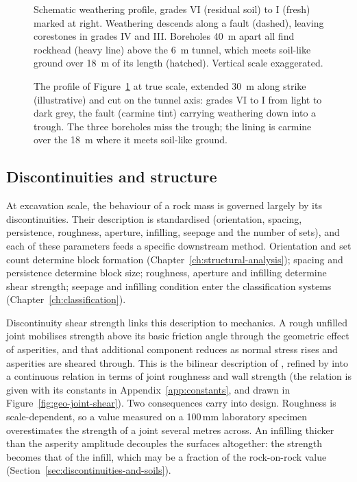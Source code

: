 \begin{figure}[htbp]
\centering
{}
\caption{Schematic weathering profile, grades VI (residual soil) to I (fresh)
marked at right. Weathering descends along a fault (dashed), leaving
corestones in grades IV and III. Boreholes 40~m apart all find rockhead (heavy
line) above the 6~m tunnel, which meets soil-like ground over 18~m of its
length (hatched). Vertical scale exaggerated.}
\label{fig:geo-weathering-profile}
\end{figure}

\begin{figure}[htbp]
\centering
{}
\caption{The profile of Figure~\ref{fig:geo-weathering-profile} at true scale,
extended 30~m along strike (illustrative) and cut on the tunnel axis: grades VI
to I from light to dark grey, the fault (carmine tint) carrying weathering down
into a trough. The three boreholes miss the trough; the lining is carmine
over the 18~m where it meets soil-like ground.}
\label{fig:r3d-weathering-block}
\end{figure}

\subsection{Discontinuities and structure}
\label{sec:discontinuities}

At excavation scale, the behaviour of a rock mass is governed largely by its
discontinuities. Their
description is standardised (orientation, spacing, persistence, roughness,
aperture, infilling, seepage and the number of sets), and each of these
parameters feeds a specific downstream method. Orientation and set count
determine block formation (Chapter~\ref{ch:structural-analysis}); spacing and
persistence determine block size; roughness, aperture and infilling determine
shear strength; seepage and infilling condition enter the classification
systems (Chapter~\ref{ch:classification}).

Discontinuity shear strength links this description to mechanics. A
rough unfilled joint mobilises strength above its basic friction angle through
the geometric effect of asperities, and that additional component reduces as
normal stress rises and asperities are sheared through. This is the bilinear description of
\citet{patton1966multiple}, refined by \citet{barton1977shear} into a continuous relation in terms
of joint roughness and wall strength (the relation is given with its
constants in Appendix~\ref{app:constants}, and drawn in
Figure~\ref{fig:geo-joint-shear}). Two consequences carry into design.
Roughness is scale-dependent, so a value measured on a 100\,mm laboratory
specimen overestimates the strength of a joint several metres across. An
infilling thicker than the asperity amplitude decouples the surfaces
altogether: the strength becomes that of the infill, which may be a fraction
of the rock-on-rock value (Section~\ref{sec:discontinuities-and-soils}).

